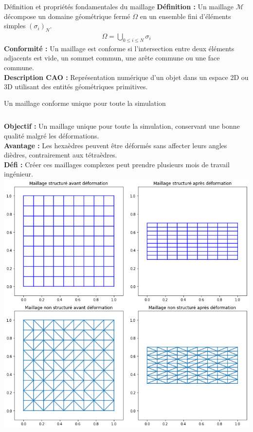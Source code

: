 \begin{frame}{Définition et propriétés fondamentales du maillage}
    \small{
        \textbf{Définition :} Un maillage $\mathcal{M}$ décompose un domaine géométrique fermé $\Omega$ en un ensemble fini d'éléments simples $(\sigma_i)_N$. 
        \begin{align*}
            \Omega = \bigcup_{0 \leq i \leq N}{\sigma_i}
        \end{align*}
    }
    \newline
    \small{
        \textbf{Conformité :} Un maillage est conforme si l'intersection entre deux éléments adjacents est vide, un sommet commun, une arête commune ou une face commune.\\
    }
    \vspace{0.5cm}
    \small{
        \textbf{Description CAO :} Représentation numérique d'un objet dans un espace 2D ou 3D utilisant des entités géométriques primitives.
    }
\end{frame}
\begin{frame}{Un maillage conforme unique pour toute la simulation}
    \begin{columns}
    \small{
        \textbf{Objectif :} Un maillage unique pour toute la simulation, conservant une bonne qualité malgré les déformations.\\
    }
    \vspace{0.3cm}
    \small{
        \textbf{Avantage :} Les hexaèdres peuvent être déformés sans affecter leurs angles dièdres, contrairement aux tétraèdres.\\
    }
    \vspace{0.3cm}
    \small{
        \textbf{Défi :} Créer ces maillages complexes peut prendre plusieurs mois de travail ingénieur.\\
    }
        \includegraphics[width=\textwidth]{img/choix_maillage/deformation_low_angle.png}
    \end{columns}
\end{frame}


